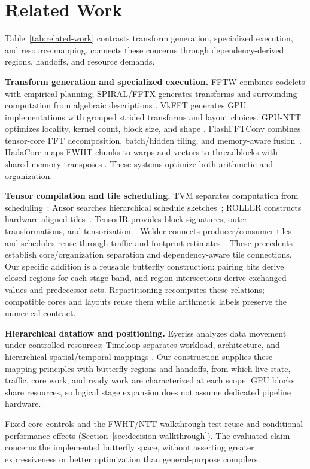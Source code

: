 \section{Related Work}
\label{sec:related}

Table~\ref{tab:related-work} contrasts transform generation, specialized
execution, and resource mapping. \system{} connects these concerns through
dependency-derived regions, handoffs, and resource demands.

\noindent\textbf{Transform generation and specialized execution.}
FFTW combines codelets with empirical planning; SPIRAL/FFTX generates
transforms and surrounding computation from algebraic descriptions
\cite{fftw2005,spiral2005,fftx2018}. VkFFT generates GPU implementations with
grouped strided transforms and layout choices. GPU-NTT optimizes locality,
kernel count, block size, and shape
\cite{vkfft2023,vkfft,gpuntt2023,gpuntt2025}.
FlashFFTConv combines tensor-core FFT decomposition, batch/hidden tiling,
and memory-aware fusion~\cite{flashfftconv2024}. HadaCore maps FWHT chunks
to warps and vectors to threadblocks with shared-memory transposes
\cite{hadacore2024}. These systems optimize both arithmetic and organization.

\noindent\textbf{Tensor compilation and tile scheduling.}
TVM separates computation from scheduling~\cite{tvm2018}; Ansor searches
hierarchical schedule sketches~\cite{ansor2020}; ROLLER constructs
hardware-aligned tiles~\cite{roller2022}. TensorIR provides block signatures,
outer transformations, and tensorization~\cite{tensorir2023}. Welder connects
producer/consumer tiles and schedules reuse through traffic and footprint
estimates~\cite{welder2023}. These precedents establish core/organization separation and dependency-aware
tile connections. Our specific addition is a reusable butterfly construction:
pairing bits derive closed regions for each stage band, and region
intersections derive exchanged values and predecessor sets. Repartitioning
recomputes these relations; compatible cores and layouts reuse them while
arithmetic labels preserve the numerical contract.

\noindent\textbf{Hierarchical dataflow and positioning.}
Eyeriss analyzes data movement under controlled resources; Timeloop separates
workload, architecture, and hierarchical spatial/temporal mappings
\cite{eyeriss2016,timeloop2019}. Our construction supplies these mapping principles with butterfly regions
and handoffs, from which live state, traffic, core work, and ready work are
characterized at each scope. GPU blocks share resources, so logical stage
expansion does not assume dedicated pipeline hardware.

Fixed-core controls and the FWHT/NTT walkthrough test reuse and conditional performance effects
(Section~\ref{sec:decision-walkthrough}). The evaluated claim concerns the
implemented butterfly space, without asserting greater expressiveness or
better optimization than general-purpose compilers.
